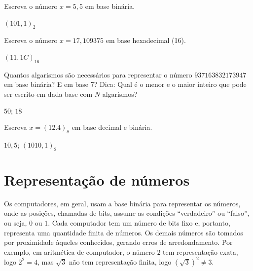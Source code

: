 \begin{exer} Escreva o número $x=5,5$ em base binária.
\end{exer}
\begin{resp}
  
    $(101,1)_2$
  
\end{resp}


\begin{exer} Escreva o número $x=17,109375$ em base hexadecimal (16).
\end{exer}
\begin{resp}
  
    $(11,1C)_{16}$    
  
\end{resp}

\begin{exer} Quantos algarismos são necessários para representar o número $937163832173947$ em base binária? E em base 7? Dica: Qual é o menor e o maior inteiro que pode ser escrito em dada base com $N$ algarismos?
\end{exer}
\begin{resp}
  
    $50$; $18$    
  
\end{resp}


\begin{exer} Escreva $x=(12.4)_8$ em base decimal e binária.
\end{exer}
\begin{resp}
  
    $10,5$; $(1010,1)_2$
  
\end{resp}

\section{Representação de números}

Os computadores, em geral, usam a base binária para representar os números, onde as posições, chamadas de bits, assume as condições ``verdadeiro'' ou ``falso'', ou seja, $0$ ou $1$. Cada computador tem um número de bits fixo e, portanto, representa uma quantidade finita de números. Os demais números são tomados por proximidade àqueles conhecidos, gerando erros de arredondamento. Por exemplo, em aritmética de computador, o número $2$ tem representação exata, logo $2^2=4$, mas $\sqrt{3}$ não tem representação finita, logo $(\sqrt{3})^2\neq 3$. 

